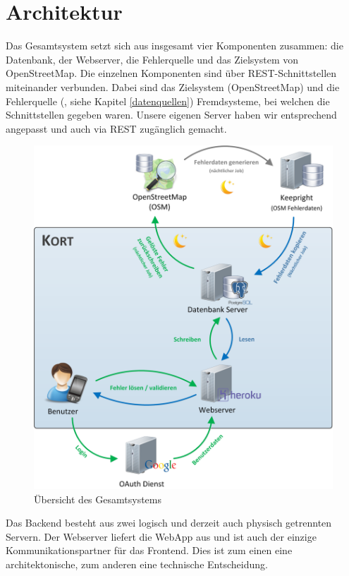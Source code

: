 \chapter{Architektur}
\label{architektur}

Das Gesamtsystem setzt sich aus insgesamt vier Komponenten zusammen: die Datenbank, der Webserver, die Fehlerquelle und das Zielsystem von \gls{OpenStreetMap}. 
Die einzelnen Komponenten sind über \gls{REST}-Schnittstellen miteinander verbunden. 
Dabei sind das Zielsystem (\gls{OpenStreetMap}) und die Fehlerquelle (, siehe Kapitel \ref{datenquellen}) Fremdsysteme, bei welchen die Schnittstellen gegeben waren. 
Unsere eigenen Server haben wir entsprechend angepasst und auch via \gls{REST} zugänglich gemacht.

\begin{figure}[H]
	\centering
	\includegraphics[scale=0.32]{images/implementation/backend/kort-big_picture}
	\caption{Übersicht des Gesamtsystems}
	\label{image-kort-big-picture}
\end{figure}

Das Backend besteht aus zwei logisch und derzeit auch physisch getrennten Servern. 
Der Webserver liefert die \gls{WebApp} aus und ist auch der einzige Kommunikationspartner für das Frontend. Dies ist zum einen eine architektonische, zum anderen eine technische Entscheidung.

